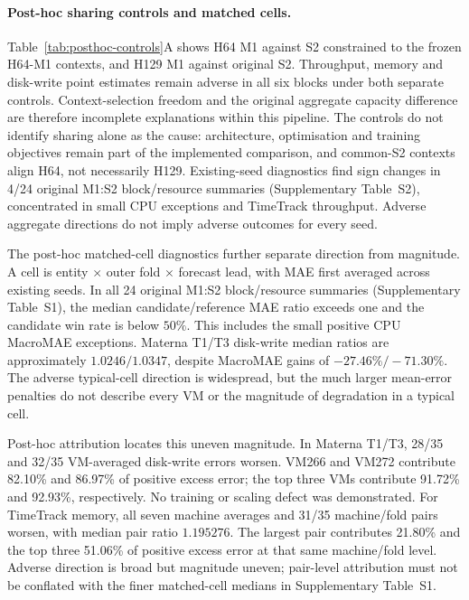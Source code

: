 \documentclass[a4paper,fleqn]{cas-dc}
\begin{document}
\paragraph{Post-hoc sharing controls and matched cells.}
Table~\ref{tab:posthoc-controls}A shows H64 M1 against S2 constrained to the
frozen H64-M1 contexts, and H129 M1 against original S2. Throughput, memory
and disk-write point estimates remain adverse in all six blocks under both
separate controls. Context-selection freedom and the original aggregate
capacity difference are therefore incomplete explanations within this
pipeline. The controls do not identify sharing alone as the cause:
architecture, optimisation and training objectives remain part of the
implemented comparison, and common-S2 contexts align H64, not necessarily
H129. Existing-seed diagnostics find sign changes in 4/24 original M1:S2
block/resource summaries (Supplementary Table~S2), concentrated in small
CPU exceptions and TimeTrack throughput. Adverse aggregate directions do not imply adverse
outcomes for every seed.

The post-hoc matched-cell diagnostics further separate direction from
magnitude. A cell is entity $\times$ outer fold $\times$ forecast lead, with
MAE first averaged across existing seeds. In all 24 original M1:S2
block/resource summaries (Supplementary Table~S1), the median candidate/reference MAE ratio exceeds
one and the candidate win rate is below $50\%$. This includes the small
positive CPU MacroMAE exceptions. Materna T1/T3 disk-write median ratios are
approximately $1.0246/1.0347$, despite MacroMAE gains of
$-27.46\%/-71.30\%$. The adverse typical-cell direction is widespread, but
the much larger mean-error penalties do not describe every VM or the
magnitude of degradation in a typical cell.

Post-hoc attribution locates this uneven magnitude. In Materna T1/T3,
28/35 and 32/35 VM-averaged disk-write errors worsen. VM266 and VM272
contribute 82.10\% and 86.97\% of positive excess error; the top three VMs
contribute 91.72\% and 92.93\%, respectively. No training or scaling defect
was demonstrated.
For TimeTrack memory, all seven machine averages and 31/35 machine/fold
pairs worsen, with median pair ratio $1.195276$. The largest pair contributes
21.80\% and the top three 51.06\% of positive excess error at that same
machine/fold level. Adverse direction is broad but magnitude uneven;
pair-level attribution must not be
conflated with the finer matched-cell medians in Supplementary Table~S1.


\end{document}
